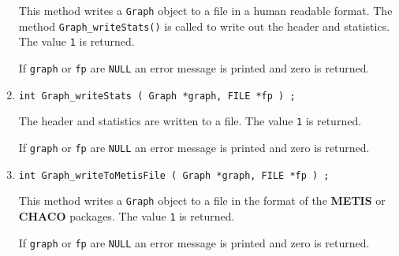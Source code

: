 \begin{enumerate}
\begin{verbatim}
\end{verbatim}
\par
This method writes a {\tt Graph} object to a file in a human
readable format.
The method {\tt Graph\_writeStats()} is called to write out the
header and statistics. 
The value {\tt 1} is returned.
\par {}
If {\tt graph} or {\tt fp} are {\tt NULL} an error message 
is printed and zero is returned.
\item
\begin{verbatim}
int Graph_writeStats ( Graph *graph, FILE *fp ) ;
\end{verbatim}
\par
The header and statistics are written to a file.
The value {\tt 1} is returned.
\par {}
If {\tt graph} or {\tt fp} are {\tt NULL} an error message 
is printed and zero is returned.
\item
\begin{verbatim}
int Graph_writeToMetisFile ( Graph *graph, FILE *fp ) ;
\end{verbatim}
\par
This method writes a {\tt Graph} object to a file in the format of
the {\bf METIS} or {\bf CHACO} packages.
The value {\tt 1} is returned.
\par {}
If {\tt graph} or {\tt fp} are {\tt NULL} an error message 
is printed and zero is returned.
\end{enumerate}
